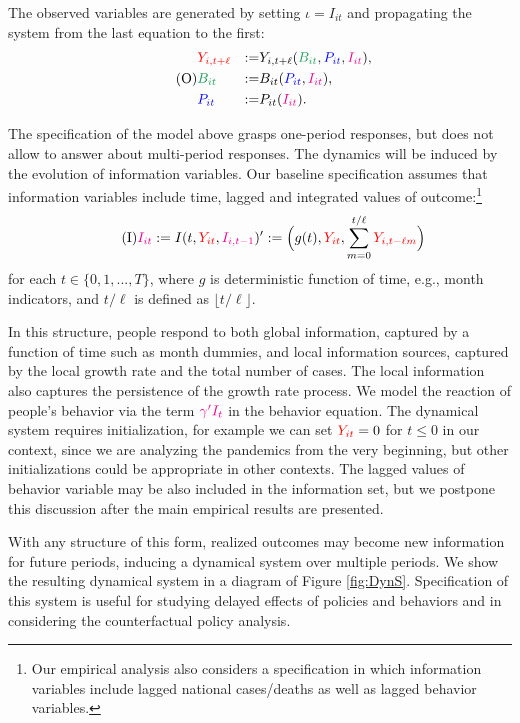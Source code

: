 \documentclass[11pt,reqno,letter]{amsart}
\theoremstyle{definition}
\def\bcolor{\color{ForestGreen}}
\def\pcolor{\color{blue}}
\def\icolor{\color{magenta}}
\def\ycolor{\color{red}}
\begin{document}
The observed variables are generated by setting $\iota = I_{it}$ and propagating
the system from the last equation to the first:
\begin{equation} \label{eqn:SEMO}\tag{O}
\begin{aligned}
& {\ycolor Y_{i,t+\ell}}  & := & Y_{i,t+\ell} ( {\bcolor B_{it} } ,{\pcolor P_{it}}, {\icolor I_{it}}), \\
& {\bcolor B_{it} } & := &   B_{it}({\pcolor P_{it} } ,{\icolor I_{it}}), \\
& {\pcolor P_{it} }& := &  P_{it}({\icolor I_{it}}). \end{aligned}
\end{equation}

The specification of the model above grasps one-period responses, but does not allow
to answer about multi-period responses.  The dynamics will be induced by the evolution
of information variables. Our baseline specification assumes that information variables include time, lagged and integrated values of outcome:\footnote{Our empirical analysis also considers a specification in which information variables include lagged national cases/deaths as well as lagged behavior variables.}
\begin{equation}\label{eq:I}\tag{I}
 {\icolor I_{it} } := I(t, {\ycolor Y_{it}},  { \icolor  I_{i, t-1} })' := \Big (g(t) , {\ycolor Y_{it}},  \sum_{m=0}^{t/\ell}
{\ycolor Y_{i,t - \ell m}} \Big )  \end{equation}
 for  each  $t \in \{0,1,...,T\}$, where $g$ is deterministic function of time, e.g., month indicators,
 and $t/\ell$ is defined as $\lfloor {t/\ell} \rfloor$.


In this structure, people respond to both global information, captured by a function of time such as month dummies, and local information sources, captured by the local growth rate and the total number of cases. The local information also captures the persistence of the growth rate process.  We model the reaction of people's behavior via the term ${\icolor \gamma'I_{t}}$ in the behavior equation.  The dynamical system requires initialization, for example we can set  ${\ycolor Y_{it}} = 0$ for $t \leq 0$ in our context, since we are analyzing the pandemics from the very beginning, but other initializations could be appropriate in other contexts. The  lagged values of behavior variable may be also included in the information set, but we postpone this discussion after the main empirical results are presented.

With any structure of this form, realized outcomes may become new information for future periods, inducing a dynamical system over multiple periods. We show the resulting dynamical system in a diagram of Figure \ref{fig:DynS}.  Specification
of this system is useful for studying delayed effects of policies and behaviors and in considering the counterfactual policy analysis.
\end{document}
